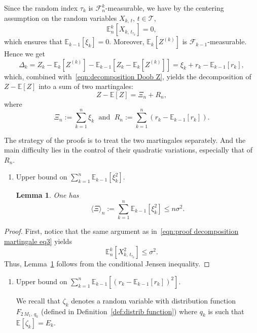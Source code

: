 \documentclass[10pt]{amsart}
\newtheorem{lemm}[theo]{Lemma}\newtheorem{prop}[theo]{Proposition}\newtheorem{coro}[theo]{Corollary}\newtheorem{conj}[theo]{Conjecture}
\theoremstyle{definition}\newtheorem{defi}[theo]{Definition}\newtheorem{rema}[theo]{Remark}\newtheorem{exam}[theo]{Example}\newtheorem{exem}[theo]{Example}\newtheorem{nota}[theo]{Notation}
\newcommand{\bE}{\mathbb{E}}
\newcommand{\cF}{\mathcal{F}}
\newcommand{\cT}{\mathcal{T}}
\newcommand*{\romanenumi}{\renewcommand*{\theenumi}{\roman{enumi}}}
\begin{document}
Since the random index $\tau_k$ is $\cF_n^k$-measurable, we have by the centering assumption on the random variables $X_{k,\,t}$, $t\in\cT$,
\begin{equation}\label{eqn:proof decomposition martingale eq3}
\bE_n^k\left[X_{k,\,t_{\tau_k}}\right] =0,
\end{equation}
which ensures that $\bE_{k-1}[\xi_k]=0$. Moreover, $\bE_k[Z^{(k)}]$ is $\cF_{k-1}$-measurable. Hence we get
\[
\Delta_k =Z_k-\bE_k\left[Z^{(k)}\right]-\bE_{k-1}\left[Z_k-\bE_k\left[Z^{(k)}\right]\right]= \xi_k + r_k -\bE_{k-1}[r_k],
\]
which, combined with~\eqref{eqn:decomposition Doob Z}, yields the decomposition of $Z-\bE[Z]$ into a sum of two martingales:
\begin{equation}\label{eqn:decomposition Z-EZ}
Z-\bE[Z]=\Xi_n +R_n,
\end{equation}
where
\begin{equation}\label{eqn:decomposition Z-EZ-def martingales}
\Xi_n:=\sum_{k=1}^n \xi_k \; \text{ and }\;R_n:= \sum_{k=1}^n \left(r_k-\bE_{k-1}[r_k]\right).
\end{equation}


The strategy of the proofs is to treat the two martingales separately. And the main difficulty lies in the control of their quadratic variations, especially that of $R_n$.
\begin{enumerate}\romanenumi
\item Upper bound on $\sum_{k=1}^n \bE_{k-1}[\xi_k^2]$.
\begin{lemm}\label{lem:upper bound quad var Xi}
One has
\[
\langle \Xi \rangle_n:=\sum_{k=1}^n \bE_{k-1}\left[\xi_k^2\right]\leq n\sigma^2.
\]
\end{lemm}
\end{enumerate}

\begin{proof}
First, notice that the same argument as in~\eqref{eqn:proof decomposition martingale eq3} yields
\[
\bE_n^k[X_{k,\,t_{\tau_k}}^2]\leq \sigma^2.
\]
Thus, Lemma~\ref{lem:upper bound quad var Xi} follows from the conditional Jensen inequality.
\end{proof}
\begin{enumerate}\romanenumi
\setcounter{enumi}{1}
\item Upper bound on $ \sum_{k=1}^n\bE_{k-1}[(r_k-\bE_{k-1}[r_k])^2]$.

We recall that $\zeta_k$ denotes a random variable with distribution function $F_{2\,M_1,\,q_k}$ (defined in Definition~\ref{def:distrib function}) where $q_k$ is such that $\bE[\zeta_k]=E_k$.
\end{enumerate}
\end{document}

